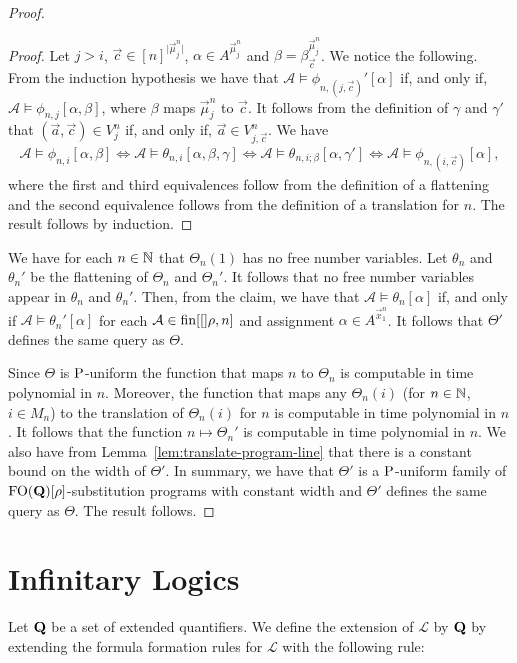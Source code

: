 \documentclass[../main/thesis.tex]{subfiles}
\begin{document}
\begin{proof}
\begin{proof}
    Let $j > i$, $\vec{c}\in [n]^{\vert \vec{\mu}^n_j \vert}$, $\alpha \in
    A^{\vec{\mu}^n_j}$ and $\beta = \beta^{\vec{\mu}^n_j}_{\vec{c}}$. We notice
    the following. From the induction hypothesis we have that $\mathcal{A}
    \models \phi_{n, (j, \vec{c})}' [\alpha]$ if, and only if, $\mathcal{A}
    \models \phi_{n, j}[\alpha, \beta]$, where $\beta$ maps $\vec{\mu}^n_j$ to
    $\vec{c}$. It follows from the definition of $\gamma$ and $\gamma'$ that
    $(\vec{a}, \vec{c}) \in V^n_{j}$ if, and only if, $\vec{a} \in V^n_{j,
      \vec{c}}$. We have
    \begin{align*}
      \mathcal{A} \models \phi_{n, i} [\alpha, \beta] \iff \mathcal{A} \models \theta_{n, i}[\alpha, \beta, \gamma] \iff \mathcal{A} \models \theta_{n, i ; \beta}[\alpha, \gamma'] \iff \mathcal{A} \models \phi_{n, (i, \vec{c})}[\alpha],
    \end{align*}
    where the first and third equivalences follow from the definition of a
    flattening and the second equivalence follows from the definition of a
    translation for $n$. The result follows by induction.
  \end{proof}

  We have for each $n \in \mathbb{N}$ that $\Theta_n(1)$ has no free number
  variables. Let $\theta_n$ and $\theta_n'$ be the flattening of $\Theta_n$ and
  $\Theta_n'$. It follows that no free number variables appear in $\theta_n$ and
  $\theta_n'$. Then, from the claim, we have that $\mathcal{A} \models
  \theta_n[\alpha]$ if, and only if $\mathcal{A} \models \theta_n'[\alpha]$ for
  each $\mathcal{A} \in \text{\upshape fin}{[[]}\rho, n]$ and assignment $\alpha \in
  A^{\vec{x}^n_1}$. It follows that $\Theta'$ defines the same query as
  $\Theta$.

  Since $\Theta$ is $\mathrm{P}$-uniform the function that maps $n$ to $\Theta_n$ is
  computable in time polynomial in $n$. Moreover, the function that maps any
  $\Theta_n(i)$ (for $n \in \mathbb{N}$, $i \in M_n$) to the translation of
  $\Theta_n(i)$ for $n$ is computable in time polynomial in $n$. It follows that
  the function $n \mapsto \Theta_n'$ is computable in time polynomial in $n$. We
  also have from Lemma~\ref{lem:translate-program-line} that there is a constant
  bound on the width of $\Theta'$. In summary, we have that $\Theta'$ is a
  $\mathrm{P}$-uniform family of $\text{\upshape FO}(\mathbf{Q})[\rho]$-substitution programs with
  constant width and $\Theta'$ defines the same query as $\Theta$. The result
  follows.
\end{proof}

\section{Infinitary Logics}
Let $\mathbf{Q}$ be a set of extended quantifiers. We define the extension of
$\mathcal{L}$ by $\mathbf{Q}$ by extending the formula formation rules for
$\mathcal{L}$ with the following rule:
\end{document}
